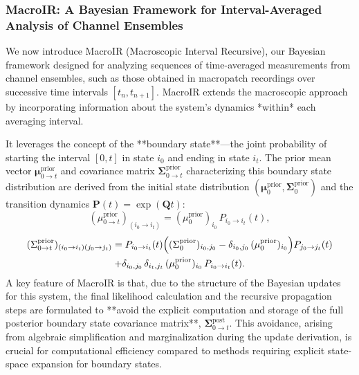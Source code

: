 \documentclass[pdflatex,sn-nature]{sn-jnl}%
\begin{document}
\subsubsection{MacroIR: A Bayesian Framework for Interval-Averaged Analysis of Channel Ensembles}

We now introduce MacroIR (Macroscopic Interval Recursive), our Bayesian framework designed for analyzing sequences of time-averaged measurements from channel ensembles, such as those obtained in macropatch recordings over successive time intervals \([t_n, t_{n+1}]\). MacroIR extends the macroscopic approach by incorporating information about the system's dynamics *within* each averaging interval.

It leverages the concept of the **boundary state**—the joint probability of starting the interval \([0, t]\) in state \(i_0\) and ending in state \(i_t\). The prior mean vector \(\boldsymbol{\mu}^{\text{prior}}_{0 \rightarrow t}\) and covariance matrix \(\boldsymbol{\Sigma}^{\text{prior}}_{0 \rightarrow t}\) characterizing this boundary state distribution are derived from the initial state distribution \((\boldsymbol{\mu}^{\text{prior}}_0, \boldsymbol{\Sigma}^{\text{prior}}_0)\) and the transition dynamics \(\mathbf{P}(t) = \exp(\boldsymbol{Q}t)\):
\begin{equation}
	(\mu^{\text{prior}}_{0 \rightarrow t})_{(i_0 \rightarrow i_t)} = (\mu^{\text{prior}}_0)_{i_0} \, P_{i_0 \rightarrow i_t}(t),
	\label{eq:boundary_mean_prior}
\end{equation}
\begin{multline}
	(\Sigma^{\text{prior}}_{0 \rightarrow t})_{(i_0 \rightarrow i_t)(j_0 \rightarrow j_t)} = P_{i_0 \rightarrow i_t}(t)\Bigl((\Sigma^{\text{prior}}_0)_{i_0,j_0} - \delta_{i_0,j_0}\, (\mu^{\text{prior}}_0)_{i_0}\Bigr) P_{j_0 \rightarrow j_t}(t) \\
	+ \delta_{i_0,j_0}\,\delta_{i_t,j_t}\, (\mu^{\text{prior}}_0)_{i_0}\, P_{i_0 \rightarrow i_t}(t).
	\label{eq:boundary_covariance_prior}
\end{multline}
A key feature of MacroIR is that, due to the structure of the Bayesian updates for this system, the final likelihood calculation and the recursive propagation steps are formulated to **avoid the explicit computation and storage of the full posterior boundary state covariance matrix**, \(\boldsymbol{\Sigma}^{\text{post}}_{0 \rightarrow t}\). This avoidance, arising from algebraic simplification and marginalization during the update derivation, is crucial for computational efficiency compared to methods requiring explicit state-space expansion for boundary states.
\end{document}
